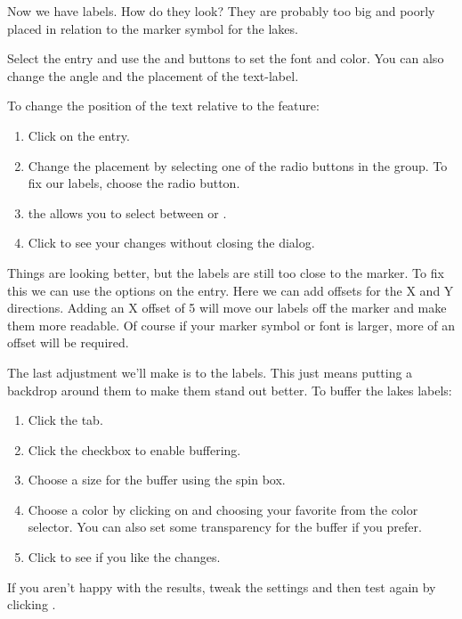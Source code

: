 Now we have labels. How do they look? They are probably too big and poorly
placed in relation to the marker symbol for the lakes.

Select the  entry and use the  and 
buttons to set the font and color. You can also change the angle and the
placement of the text-label.

To change the position of the text relative to the feature:

\begin{enumerate}
\item Click on the  entry.
\item Change the placement by selecting one of the radio buttons
in the  group. To fix our labels, choose the
 radio button.
\item the  allows you to select between
 or .
\item Click  to see your changes without closing the dialog.
\end{enumerate}

Things are looking better, but the labels are still too close to the marker. To
fix this we can use the options on the  entry. Here we can add
offsets for the X and Y directions. Adding an X offset of 5 will move our
labels off the marker and make them more readable. Of course if your marker
symbol or font is larger, more of an offset will be required.

The last adjustment we'll make is to  the labels. This just means
putting a backdrop around them to make them stand out better. To buffer the
lakes labels:

\begin{enumerate}
\item Click the  tab.
\item Click the  checkbox to enable buffering.
\item Choose a size for the buffer using the spin box.
\item Choose a color by clicking on  and choosing your
  favorite from the color selector. You can also set some transparency for the
  buffer if you prefer.
\item Click  to see if you like the changes.
\end{enumerate}

If you aren't happy with the results, tweak the settings and then test again
by clicking .

